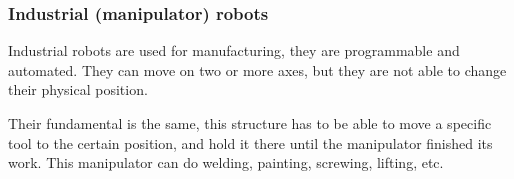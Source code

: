 			\subsubsection{Industrial (manipulator) robots}
			
				\hspace{15pt}Industrial robots are used for manufacturing, they are programmable and automated. They can move on two or more axes, but they are not able to change their physical position.
				
				Their fundamental is the same, this structure has to be able to move a specific tool to the certain position, and hold it there until the manipulator finished its work. This manipulator can do welding, painting, screwing, lifting, etc.

